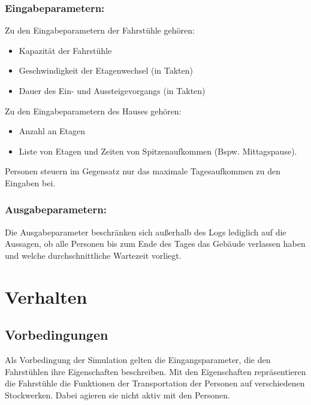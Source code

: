 \documentclass[envcountsame, envcountchap, deutsch]{i-studis}
\providecommand{\tightlist}{%
  \setlength{\itemsep}{0pt}\setlength{\parskip}{0pt}}
\begin{document}
\hypertarget{eingabeparametern}{%
\subsection{Eingabeparametern:}\label{eingabeparametern}}

Zu den Eingabeparametern der Fahrstühle gehören:

\begin{itemize}
\tightlist
\item
  Kapazität der Fahrstühle
\item
  Geschwindigkeit der Etagenwechsel (in Takten)
\item
  Dauer des Ein- und Aussteigevorgangs (in Takten)
\end{itemize}

Zu den Eingabeparametern des Hauses gehören:

\begin{itemize}
\tightlist
\item
  Anzahl an Etagen
\item
  Liste von Etagen und Zeiten von Spitzenaufkommen (Bspw. Mittagspause).
\end{itemize}

Personen steuern im Gegensatz nur das maximale Tagesaufkommen zu den
Eingaben bei.

\hypertarget{ausgabeparametern}{%
\subsection{Ausgabeparametern:}\label{ausgabeparametern}}

Die Ausgabeparameter beschränken sich außerhalb des Logs lediglich auf
die Aussagen, ob alle Personen bis zum Ende des Tages das Gebäude
verlassen haben und welche durchschnittliche Wartezeit vorliegt.

\hypertarget{verhalten}{%
\chapter{Verhalten}\label{verhalten}}

\hypertarget{vorbedingungen}{%
\section{Vorbedingungen}\label{vorbedingungen}}

Als Vorbedingung der Simulation gelten die Eingangsparameter, die den
Fahrstühlen ihre Eigenschaften beschreiben. Mit den Eigenschaften
repräsentieren die Fahrstühle die Funktionen der Transportation der
Personen auf verschiedenen Stockwerken. Dabei agieren sie nicht aktiv
mit den Personen.
\end{document}

